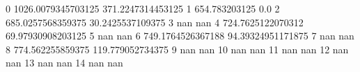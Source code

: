 0 1026.0079345703125 371.2247314453125
1 654.783203125 0.0
2 685.0257568359375 30.2425537109375
3 nan nan
4 724.7625122070312 69.97930908203125
5 nan nan
6 749.1764526367188 94.39324951171875
7 nan nan
8 774.562255859375 119.779052734375
9 nan nan
10 nan nan
11 nan nan
12 nan nan
13 nan nan
14 nan nan
